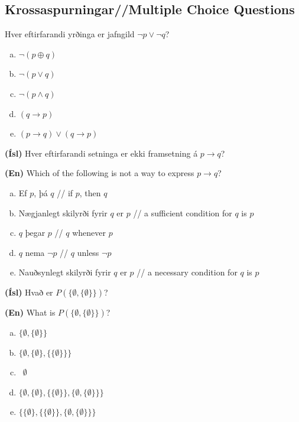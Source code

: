 \documentclass[addpoints]{exam}
\begin{document}
\begin{questions}
        
\section{Krossaspurningar//Multiple Choice Questions}

\question[3] Hver eftirfarandi yrðinga er jafngild $\lnot  p \lor \lnot q$?

\begin{enumerate}[a)]
    \item $\lnot (p \oplus q)$
    \item $\lnot (p \lor q)$
    \item $\lnot (p \land q)$ %
    \item $(q \to p)$
    \item $(p \to q) \lor (q \to p)$
\end{enumerate}

\question[3] 

\textbf{(Ísl)} Hver eftirfarandi setninga er ekki framsetning á $p \to q$?

\textbf{(En)} Which of the following is not a way to express $p \to q$?

\begin{enumerate}[a)]
    \item Ef $p$, þá $q$ // if $p$, then $q$
    \item Nægjanlegt skilyrði fyrir $q$ er $p$ // a sufficient condition for $q$ is $p$
    \item $q$ þegar $p$ // $q$ whenever $p$
    \item $q$ nema $\lnot p$ // $q$ unless $\lnot p$
    \item Nauðsynlegt skilyrði fyrir $q$ er $p$ // a necessary condition for $q$ is $p$ %
\end{enumerate}

\question[3] 

\textbf{(Ísl)}  Hvað er $P(\{\emptyset,\{\emptyset\}\})$?

\textbf{(En)} What is $P(\{\emptyset,\{\emptyset\}\})$?

\begin{enumerate}[a)]
    \item $\{\emptyset,\{\emptyset\}\}$
    \item $\{\emptyset,\{\emptyset\}, \{\{\emptyset\}\}\}$
    \item $\phantom{\{}\emptyset$
    \item $\{\emptyset,\{\emptyset\}, \{\{\emptyset\}\}, \{\emptyset,\{\emptyset\}\}\}$ %
    \item $\{\{\emptyset\}, \{\{\emptyset\}\}, \{\emptyset,\{\emptyset\}\}\}$
\end{enumerate}


\end{questions}
\end{document}

